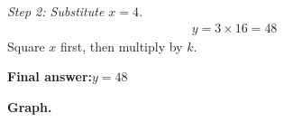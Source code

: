 \documentclass[11pt]{article}
\begin{document}
\textit{Step 2: Substitute \( x = 4 \).}
\[\begin{gathered}
y = 3 \times 16 = 48
\end{gathered}\]
Square \( x \) first, then multiply by \( k \).

\begin{answerbox}
\textbf{Final answer:}\quad \(\displaystyle  y = 48 \)
\end{answerbox}
\textbf{Graph.}

\begin{center}
\end{center}
\end{document}
